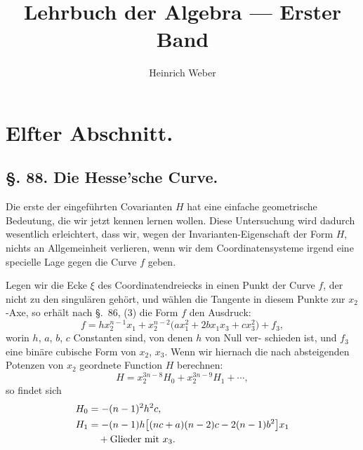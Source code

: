 \documentclass[12pt,a4paper]{article}
\title{Lehrbuch der Algebra --- Erster Band}
\author{Heinrich Weber}
\date{}
\theoremstyle{plain}
\theoremstyle{definition}
\theoremstyle{remark}
\begin{document}
\maketitle

\thispagestyle{empty}
\newpage

\section*{Elfter Abschnitt.}

\subsection*{§. 88. Die Hesse'sche Curve.}

Die erste der eingeführten Covarianten $H$ hat eine einfache
geometrische Bedeutung, die wir jetzt kennen lernen wollen.
Diese Untersuchung wird dadurch wesentlich erleichtert, dass
wir, wegen der Invarianten-Eigenschaft der Form $H$, nichts an
Allgemeinheit verlieren, wenn wir dem Coordinatensysteme irgend
eine specielle Lage gegen die Curve $f$ geben.

Legen wir die Ecke $\xi$ des Coordinatendreiecks in einen
Punkt der Curve $f$, der nicht zu den singulären gehört, und
wählen die Tangente in diesem Punkte zur $x_2$-Axe, so erhält
nach \S.~86, (3) die Form $f$ den Ausdruck:
\begin{equation}\label{eq:88_1}
f = hx_2^{n-1}x_1 + x_2^{n-2}\bigl(a x_1^2 + 2b x_1 x_3 + c x_3^2\bigr) + f_3,
\end{equation}
worin $h$, $a$, $b$, $c$ Constanten sind, von denen $h$ von Null ver-
schieden ist, und $f_3$ eine binäre cubische Form von $x_2$, $x_3$.
Wenn wir hiernach die nach absteigenden Potenzen von $x_2$
geordnete Function $H$ berechnen:
\begin{equation}\label{eq:88_2}
H = x_2^{3n-8} H_0 + x_2^{3n-9} H_1 + \cdots,
\end{equation}
so findet sich
\begin{align}
H_0 &= -(n-1)^2 h^2 c, \label{eq:88_3a} \\
H_1 &= -(n-1)h\bigl[(nc+a)(n-2)c - 2(n-1)b^2\bigr] x_1 \label{eq:88_3b} \\
&\quad + \text{Glieder mit } x_3. \notag
\end{align}
\end{document}
